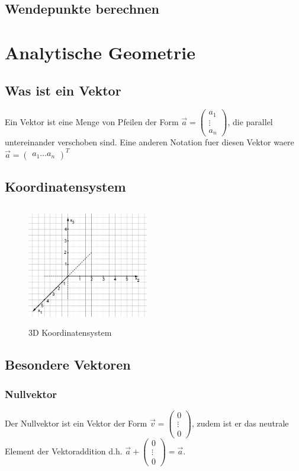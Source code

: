 \documentclass[a4paper]{article} %
\begin{document}
	\subsection{Wendepunkte berechnen}
	\pagebreak
	\section{Analytische Geometrie}
	\subsection{Was ist ein Vektor}
	Ein Vektor ist eine Menge von Pfeilen der Form $\vec{a} = \begin{pmatrix} a_1 \\ \vdots \\ a_n \end{pmatrix} $, die parallel untereinander verschoben sind.
	Eine anderen Notation fuer diesen Vektor waere $\vec{a} = \begin{pmatrix} a_1  \hdots  a_n \end{pmatrix}^T $
	\subsection{Koordinatensystem}
	\begin{minipage}{0.5\textwidth}
			\begin{figure}[H]
				\includegraphics[width=200px, height=200px]{koordinatensystem.png}
					\captionsetup{labelformat=empty}
				\caption{3D Koordinatensystem}
			\end{figure}
		\end{minipage} 
	\subsection{Besondere Vektoren}
	\subsubsection{Nullvektor}
	Der Nullvektor ist ein Vektor der Form $\vec{v} = \begin{pmatrix} 0 \\ \vdots \\ 0 \end{pmatrix}$, 
	 zudem ist er das neutrale Element der Vektoraddition d.h. $ \vec{a} + \begin{pmatrix} 0 \\ \vdots \\ 0 \end{pmatrix} = \vec{a}$.
\end{document}
